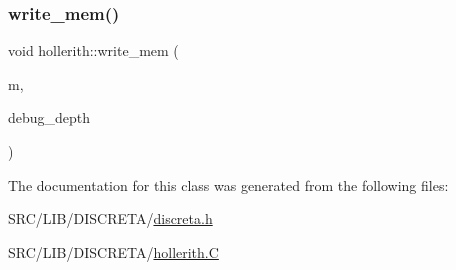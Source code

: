 \mbox{\label{classhollerith_a8d17739da6b15b91053f8356b824407d}} 
\subsubsection{\texorpdfstring{write\+\_\+mem()}{write\_mem()}}
{\footnotesize\ttfamily void hollerith\+::write\+\_\+mem (\begin{DoxyParamCaption}\item[{\mbox{\hyperlink{classmemory}{memory}} \&}]{m,  }\item[{\mbox{\hyperlink{galois_8h_a09fddde158a3a20bd2dcadb609de11dc}{I\+NT}}}]{debug\+\_\+depth }\end{DoxyParamCaption})}



The documentation for this class was generated from the following files\+:\begin{DoxyCompactItemize}
\item 
S\+R\+C/\+L\+I\+B/\+D\+I\+S\+C\+R\+E\+T\+A/\mbox{\hyperlink{discreta_8h}{discreta.\+h}}\item 
S\+R\+C/\+L\+I\+B/\+D\+I\+S\+C\+R\+E\+T\+A/\mbox{\hyperlink{hollerith_8_c}{hollerith.\+C}}\end{DoxyCompactItemize}
